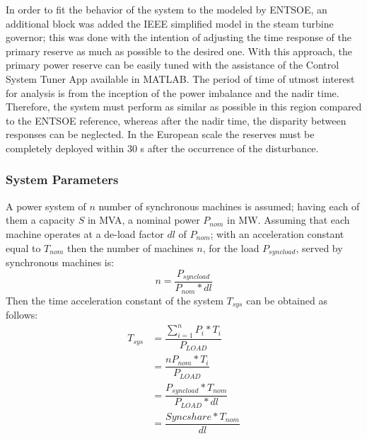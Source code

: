 In order to fit the behavior of the system to the modeled by ENTSOE, an additional block was added the IEEE simplified model in the steam turbine governor; this was done with the intention of adjusting the time response of the primary reserve as much as possible to the desired one. With this approach, the primary power reserve can be easily tuned with the assistance of the Control System Tuner App available in MATLAB. The period of time of utmost interest for analysis is from the inception of the power imbalance and the nadir time. Therefore, the system must perform as similar as possible in this region compared to the ENTSOE reference, whereas after the nadir time, the disparity between responses can be neglected. In the European scale the reserves must be completely deployed within 30 s after the occurrence of the disturbance.  






\subsubsection{System Parameters}

A power system of $ n $ number of synchronous machines is assumed; having each of them a capacity $ S $ in MVA, a nominal power $ P_{nom} $ in MW.
Assuming that each machine operates at a de-load factor $ dl $ of $ P_{nom} $; with an acceleration constant equal to $ T_{nom} $ then the number of machines $ n $, for the load $ P_{syncload} $, served by synchronous machines is:
\begin{equation}
	n=\dfrac{P_{syncload}}{P_{nom}*dl}
\end{equation}
Then the time acceleration constant of the system $ T_{sys} $ can be obtained as follows:
\begin{align}
	T_{sys} &=\dfrac{\sum_{i=1}^nP_i*T_i}{P_{LOAD}}\nonumber  \\ 
	 &=\dfrac{nP_{nom}*T_i}{P_{LOAD}}\nonumber \\
	&=\dfrac{P_{syncload}*T_{nom}}{P_{LOAD}*dl}\nonumber\\	
		&=\dfrac{Sync share*T_{nom}}{dl} \label{eq:tsyseuro}
\end{align}




